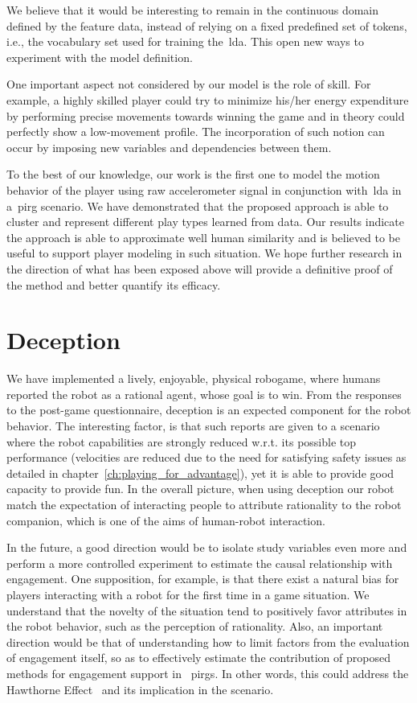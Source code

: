 We believe that it would be interesting to remain in the continuous domain defined by the feature data, instead of relying on a fixed predefined set of tokens, i.e., the vocabulary set used for training the~\gls{lda}. This open new ways to experiment with the model definition.

One important aspect not considered by our model is the role of skill. For example, a highly skilled player could try to minimize his/her energy expenditure by performing precise movements towards winning the game and in theory could perfectly show a low-movement profile.  The incorporation of such notion can occur by imposing new variables and dependencies between them. 

To the best of our knowledge, our work is the first one to model the motion behavior of the player using raw accelerometer signal in conjunction with~\gls{lda} in a~\gls{pirg} scenario. We have demonstrated that the proposed approach is able to cluster and represent different play types learned from data. Our results indicate the approach is able to approximate well human similarity and is believed to be useful to support player modeling in such situation. We hope further research in the direction of what has been exposed above will provide a definitive proof of the method and better quantify its efficacy. 

\section{Deception}
We have implemented a lively, enjoyable, physical robogame, where humans reported the robot as a rational agent, whose goal is to win. From the responses to the post-game questionnaire, deception is an expected component for the robot behavior. The interesting factor, is that such reports are given to a scenario where the robot capabilities are strongly reduced w.r.t. its possible top performance (\eg velocities are reduced due to the need for satisfying safety issues as detailed in chapter~\ref{ch:playing_for_advantage}), yet it is able to provide good capacity to provide fun. In the overall picture, when using deception our robot match the expectation of interacting people to attribute rationality to the robot companion, which is one of the aims of human-robot interaction.

In the future, a good direction would be to isolate study variables even more and perform a more controlled experiment to estimate the causal relationship with engagement. One supposition, for example, is that there exist a natural bias for players interacting with a robot for the first time in a game situation. We understand that the novelty of the situation tend to positively favor attributes in the robot behavior, such as the perception of rationality. Also, an important direction would be that of understanding how to limit factors from the evaluation of engagement itself, so as to effectively estimate the contribution of proposed methods for engagement support in ~\gls{pirg}s. In other words, this could address the Hawthorne Effect~\citep{jones_was_1992} and its implication in the scenario.

